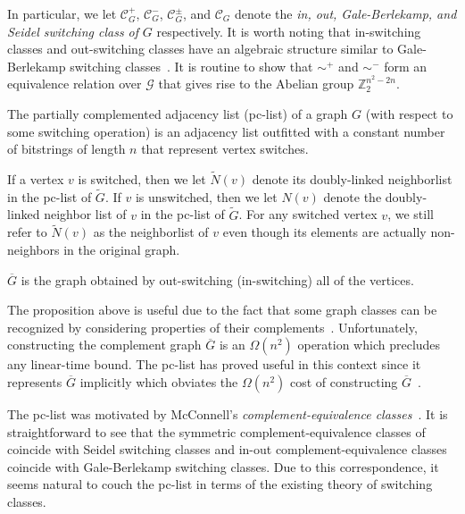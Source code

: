 \documentclass{llncs}
\begin{document}
\noindent 
In particular, we let $\mathcal{C}^{+}_G$, $\mathcal{C}^{-}_G$, $\mathcal{C}^{\pm}_G$, and $\mathcal{C}_G$ denote the \emph{in, out, Gale-Berlekamp, and Seidel switching class of} $G$ respectively.  It is worth noting that in-switching classes and out-switching classes have an algebraic structure similar to Gale-Berlekamp switching classes~\cite{RothV08}. It is routine to show that  $\sim^+$ and $\sim^-$ form an equivalence relation over $\mathcal{G}$ that gives rise to the Abelian group $\mathbb{Z}_2^{n^2-2n}$.



\begin{definition}
The partially complemented adjacency list (pc-list) of a graph $G$ (with respect to some switching operation) is an adjacency list outfitted with a constant number of bitstrings of length $n$ that represent vertex switches.
\end{definition}
If a vertex $v$ is switched, then we let $\widetilde{N}(v)$ denote its doubly-linked neighborlist in the pc-list of $\widetilde{G}$.  If $v$ is unswitched, then we let $N(v)$ denote the doubly-linked neighbor list of $v$ in the pc-list of $\widetilde{G}$.  For any switched vertex $v$, we still refer to $\widetilde{N}(v)$ as the neighborlist of $v$ even though its elements are actually non-neighbors in the original graph.

\begin{proposition}
$\overline{G}$ is the graph obtained by out-switching (in-switching) all of the vertices.
\end{proposition}
\noindent The proposition above is useful due to the fact that some graph classes can be recognized by considering properties of their complements~\cite{McConnellS99}. Unfortunately, constructing the complement graph $\overline{G}$ is an $\Omega(n^2)$ operation which precludes any linear-time bound.  The pc-list has proved useful in this context since it represents $\overline{G}$ implicitly which obviates the $\Omega(n^2)$ cost of constructing $\overline{G}$~\cite{DahlhausGM02,McConnellS99}.

The pc-list was motivated by McConnell's \emph{complement-equivalence classes}~\cite{McConnell97}.  It is straightforward to see that the symmetric complement-equivalence classes of~\cite{DahlhausGM02} coincide with Seidel switching classes and in-out complement-equivalence classes~\cite{DahlhausGM02} coincide with Gale-Berlekamp switching classes.  Due to this correspondence, it seems natural to couch the pc-list in terms of the existing theory of switching classes. 
\end{document}
